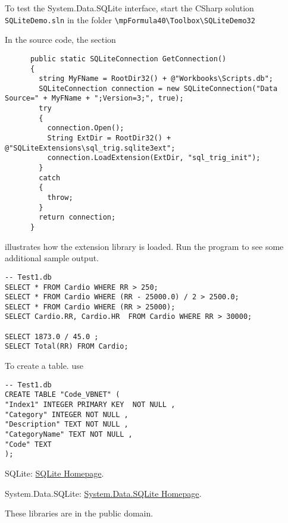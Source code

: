 To test the System.Data.SQLite interface, start the CSharp solution \verb|SQLiteDemo.sln| in the folder 
\verb|\mpFormula40\Toolbox\SQLiteDemo32|

\vpara
In the source code, the section 

\begin{lstlisting}
      public static SQLiteConnection GetConnection()
      {
        string MyFName = RootDir32() + @"Workbooks\Scripts.db";
        SQLiteConnection connection = new SQLiteConnection("Data Source=" + MyFName + ";Version=3;", true);
        try
        {
          connection.Open();
          String ExtDir = RootDir32() + @"SQLiteExtensions\sql_trig.sqlite3ext";
          connection.LoadExtension(ExtDir, "sql_trig_init");
        }
        catch
        {
          throw;
        }
        return connection;
      }
\end{lstlisting}
illustrates how the extension library is loaded. Run the program to see some additional sample output.





\vpara

\begin{lstlisting}
-- Test1.db
SELECT * FROM Cardio WHERE RR > 250;
SELECT * FROM Cardio WHERE (RR - 25000.0) / 2 > 2500.0;
SELECT * FROM Cardio WHERE (RR > 25000);
SELECT Cardio.RR, Cardio.HR  FROM Cardio WHERE RR > 30000;

SELECT 1873.0 / 45.0 ;
SELECT Total(RR) FROM Cardio; 
\end{lstlisting}

To create a table. use

\begin{lstlisting}
-- Test1.db
CREATE TABLE "Code_VBNET" (
"Index1" INTEGER PRIMARY KEY  NOT NULL ,
"Category" INTEGER NOT NULL ,
"Description" TEXT NOT NULL ,
"CategoryName" TEXT NOT NULL ,
"Code" TEXT
);
\end{lstlisting}







SQLite: \href{http://www.sqlite.org/}{SQLite Homepage}. 

System.Data.SQLite: \href{http://system.data.sqlite.org/index.html/doc/trunk/www/index.wiki}{System.Data.SQLite Homepage}. 


These libraries are in the public domain.



